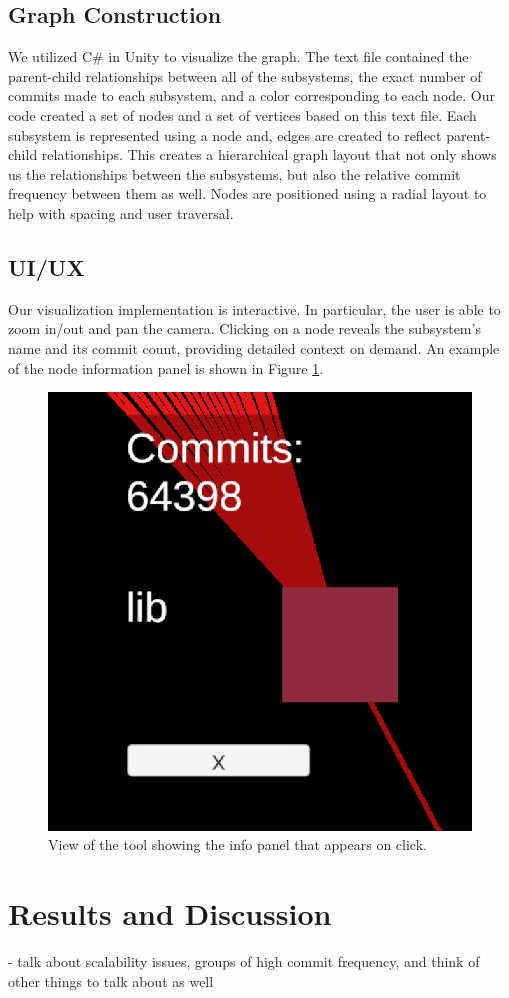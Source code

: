 \documentclass[conference]{IEEEtran}
\begin{document}
\subsection{Graph Construction}
We utilized C\# in Unity to visualize the graph. The text file contained the parent-child relationships between all of the subsystems, the exact number of commits made to each subsystem, and a color corresponding to each node. Our code created a set of nodes and a set of vertices based on this text file. Each subsystem is represented using a node and, edges are created to reflect parent-child relationships. This creates a hierarchical graph layout that not only shows us the relationships between the subsystems, but also the relative commit frequency between them as well. Nodes are positioned using a radial layout to help with spacing and user traversal.



\subsection{UI/UX}
Our visualization implementation is interactive. In particular, the user is able to zoom in/out and pan the camera. Clicking on a node reveals the subsystem’s name and its commit count, providing detailed context on demand. An example of the node information panel is shown in Figure \ref{inner}.

\begin{figure}[h!]
	\centering
	\includegraphics[width = .3\textwidth]{commitPanel.png}
	\caption{View of the tool showing the info panel that appears on click.}
	\label{inner}
\end{figure}



\section{Results and Discussion}
\label{resAndDisc}

- talk about scalability issues, groups of high commit frequency, and think of other things to talk about as well
\end{document}
